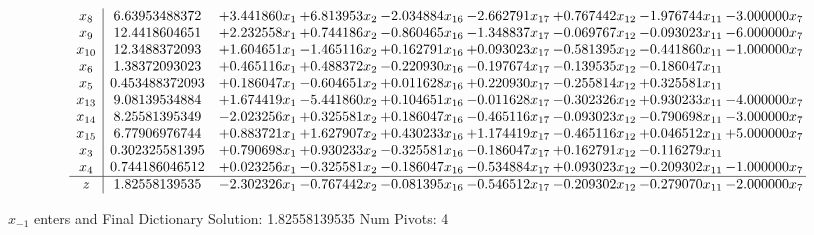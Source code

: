 \documentclass[10pt]{article}
\begin{document}
 \[\begin{array}{c| c c@{\hskip 2pt} c@{\hskip 2pt} c@{\hskip 2pt} c@{\hskip 2pt} c@{\hskip 2pt} c@{\hskip 2pt} c@{\hskip 2pt} }
 x_{8}   &  6.63953488372 & + 3.441860 x_{1} & + 6.813953 x_{2} & -2.034884 x_{16} & -2.662791 x_{17} & + 0.767442 x_{12} & -1.976744 x_{11} & -3.000000 x_{7}\\
 x_{9}   &  12.4418604651 & + 2.232558 x_{1} & + 0.744186 x_{2} & -0.860465 x_{16} & -1.348837 x_{17} & -0.069767 x_{12} & -0.093023 x_{11} & -6.000000 x_{7}\\
 x_{10}   &  12.3488372093 & + 1.604651 x_{1} & -1.465116 x_{2} & + 0.162791 x_{16} & + 0.093023 x_{17} & -0.581395 x_{12} & -0.441860 x_{11} & -1.000000 x_{7}\\
 x_{6}   &  1.38372093023 & + 0.465116 x_{1} & + 0.488372 x_{2} & -0.220930 x_{16} & -0.197674 x_{17} & -0.139535 x_{12} & -0.186047 x_{11} &   \\
 x_{5}   &  0.453488372093 & + 0.186047 x_{1} & -0.604651 x_{2} & + 0.011628 x_{16} & + 0.220930 x_{17} & -0.255814 x_{12} & + 0.325581 x_{11} &   \\
 x_{13}   &  9.08139534884 & + 1.674419 x_{1} & -5.441860 x_{2} & + 0.104651 x_{16} & -0.011628 x_{17} & -0.302326 x_{12} & + 0.930233 x_{11} & -4.000000 x_{7}\\
 x_{14}   &  8.25581395349 & -2.023256 x_{1} & + 0.325581 x_{2} & + 0.186047 x_{16} & -0.465116 x_{17} & -0.093023 x_{12} & -0.790698 x_{11} & -3.000000 x_{7}\\
 x_{15}   &  6.77906976744 & + 0.883721 x_{1} & + 1.627907 x_{2} & + 0.430233 x_{16} & + 1.174419 x_{17} & -0.465116 x_{12} & + 0.046512 x_{11} & + 5.000000 x_{7}\\
 x_{3}   &  0.302325581395 & + 0.790698 x_{1} & + 0.930233 x_{2} & -0.325581 x_{16} & -0.186047 x_{17} & + 0.162791 x_{12} & -0.116279 x_{11} &   \\
 x_{4}   &  0.744186046512 & + 0.023256 x_{1} & -0.325581 x_{2} & -0.186047 x_{16} & -0.534884 x_{17} & + 0.093023 x_{12} & -0.209302 x_{11} & -1.000000 x_{7}\\
\hline
z    &  1.82558139535 & -2.302326 x_{1} & -0.767442 x_{2} & -0.081395 x_{16} & -0.546512 x_{17} & -0.209302 x_{12} & -0.279070 x_{11} & -2.000000 x_{7}\\
\end{array}\]


 $ x_{-1} $ enters and Final Dictionary
Solution:  1.82558139535
Num Pivots:  4
\end{document}
